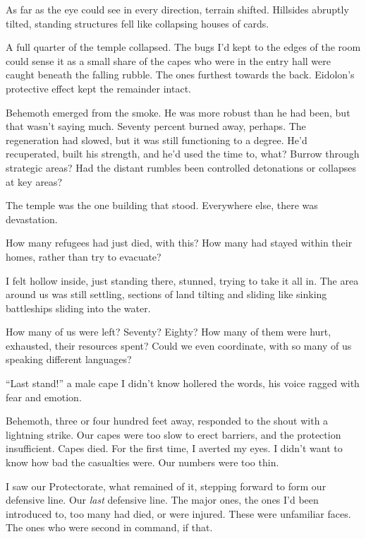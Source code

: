 As far as the eye could see in every direction, terrain shifted.  Hillsides abruptly tilted, standing structures fell like collapsing houses of cards.



A full quarter of the temple collapsed.  The bugs I'd kept to the edges of the room could sense it as a small share of the capes who were in the entry hall were caught beneath the falling rubble.  The ones furthest towards the back.  Eidolon's protective effect kept the remainder intact.



Behemoth emerged from the smoke.  He was more robust than he had been, but that wasn't saying much.  Seventy percent burned away, perhaps.  The regeneration had slowed, but it was still functioning to a degree.  He'd recuperated, built his strength, and he'd used the time to, what?  Burrow through strategic areas?  Had the distant rumbles been controlled detonations or collapses at key areas?



The temple was the one building that stood.  Everywhere else, there was devastation.



How many refugees had just died, with this?  How many had stayed within their homes, rather than try to evacuate?



I felt hollow inside, just standing there, stunned, trying to take it all in.  The area around us was still settling, sections of land tilting and sliding like sinking battleships sliding into the water.



How many of us were left?  Seventy?  Eighty?  How many of them were hurt, exhausted, their resources spent?  Could we even coordinate, with so many of us speaking different languages?



``Last stand!'' a male cape I didn't know hollered the words, his voice ragged with fear and emotion.



Behemoth, three or four hundred feet away, responded to the shout with a lightning strike.  Our capes were too slow to erect barriers, and the protection insufficient.  Capes died.  For the first time, I averted my eyes.  I didn't want to know how bad the casualties were.  Our numbers were too thin.



I saw our Protectorate, what remained of it, stepping forward to form our defensive line.  Our \emph{last} defensive line.  The major ones, the ones I'd been introduced to, too many had died, or were injured.  These were unfamiliar faces.  The ones who were second in command, if that.



